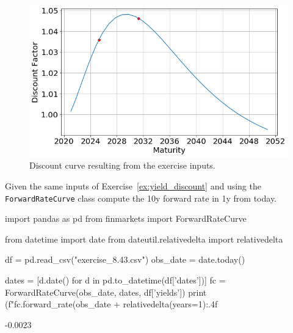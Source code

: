 \begin{solution}
\begin{figure}[htpb]
\centering
\includegraphics[width=0.7\linewidth]{figures/ex_discount}
\caption{Discount curve resulting from the exercise inputs.}
\label{fig:ex_discount}
\end{figure}
\end{solution}

%
%


\begin{question}
Given the same inputs of Exercise~\ref{ex:yield_discount} and using the \texttt{ForwardRateCurve} class compute the 10y forward rate in 1y from today. 
\end{question}

\cprotEnv\begin{solution}
\begin{ipython}
import pandas as pd
from finmarkets import ForwardRateCurve

from datetime import date
from dateutil.relativedelta import relativedelta

df = pd.read_csv("exercise_8.43.csv")
obs_date = date.today()

dates = [d.date() for d in pd.to_datetime(df['dates'])]
fc = ForwardRateCurve(obs_date, dates, df['yields'])
print (f"{fc.forward_rate(obs_date + relativedelta(years=1):.4f}%
\end{ipython}
\begin{ioutput}
-0.0023%
\end{ioutput}
\end{solution}

